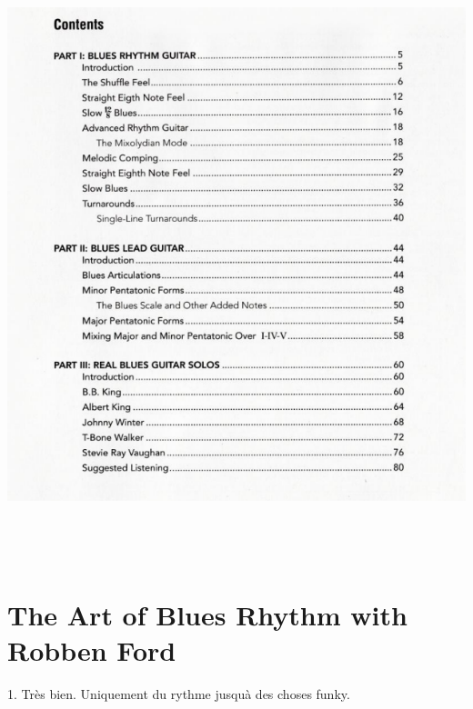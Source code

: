 \documentclass[a4paper]{book}
\begin{document}
\begin{center}
\includegraphics[width=16.374cm,height=17.644cm]{lebluessupportsmethodes-img138.png}
\end{center}
\clearpage\section[The Art of Blues Rhythm with Robben Ford]{The Art
of Blues Rhythm with Robben Ford}
\hypertarget{RefHeadingToc190973218262}{}1. Tr\`es bien. Uniquement du
rythme jusqu{\textquotesingle}\`a des choses funky.
\end{document}
